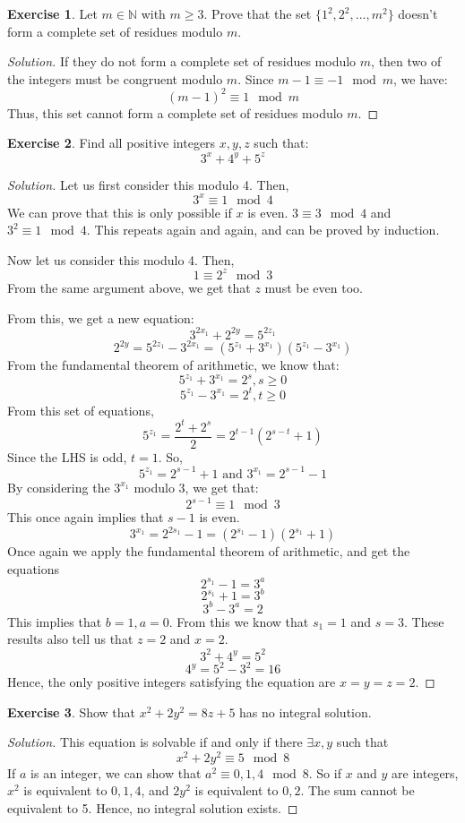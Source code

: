 \documentclass[12pt,letterpaper]{amsbook}
\theoremstyle{definition}
\newtheorem*{exercise}{Exercise}
\newenvironment{solution}
  {\renewcommand\qedsymbol{$\blacksquare$}\begin{proof}[Solution]}
  {\end{proof}}
\newcommand{\N}{\mathbb{N}}
\begin{document}
\begin{exercise}
  Let $m \in \N$ with $m \geq 3$. Prove that the set $\{1^2,2^2,...,m^2\}$ doesn't form a complete set of residues modulo $m$.
\end{exercise}
\begin{solution}
  If they do not form a complete set of residues modulo $m$, then two of the integers must be congruent modulo $m$. Since $m-1 \equiv -1 \mod m$, we have:
  \[(m-1)^2 \equiv 1 \mod m\]
  Thus, this set cannot form a complete set of residues modulo $m$.
\end{solution}

\begin{exercise}
  Find all positive integers $x,y,z$ such that:
  \[3^x + 4^y + 5^z\]
\end{exercise}
\begin{solution}
  Let us first consider this modulo 4. Then,
  \[3^x \equiv 1 \mod 4\]
  We can prove that this is only possible if $x$ is even. $3 \equiv 3 \mod 4$ and $3^2 \equiv 1 \mod 4$. This repeats again and again, and can be proved by induction.

  Now let us consider this modulo 4. Then,
  \[1 \equiv 2^z \mod 3\]
  From the same argument above, we get that $z$ must be even too.

  From this, we get a new equation:
  \[3^{2x_1} + 2^{2y} = 5^{2z_1}\]
  \[2^{2y} = 5^{2z_1} - 3^{2x_1} = (5^{z_1} + 3^{x_1})(5^{z_1} - 3^{x_1})\]
  From the fundamental theorem of arithmetic, we know that:
  \[5^{z_1} + 3^{x_1} = 2^s, s \geq 0\]
  \[5^{z_1} - 3^{x_1} = 2^t, t \geq 0\]
  From this set of equations,
  \[5^{z_1} = \frac{2^t+2^s}{2} = 2^{t-1}(2^{s-t}+1)\]
  Since the LHS is odd, $t = 1$. So,
  \[5^{z_1} = 2^{s-1}+1 \text{ and } 3^{x_1} = 2^{s-1}-1\]
  By considering the $3^{x_1}$ modulo 3, we get that:
  \[2^{s-1} \equiv 1 \mod 3\]
  This once again implies that $s-1$ is even.
  \[3^{x_1} = 2^{2s_1} - 1 = (2^{s_1} - 1)(2^{s_1} + 1)\]
  Once again we apply the fundamental theorem of arithmetic, and get the equations
  \[2^{s_1}-1 = 3^a\]
  \[2^{s_1}+1 = 3^b\]
  \[3^b-3^a = 2\]
  This implies that $b = 1, a = 0$. From this we know that $s_1 = 1$ and $s = 3$. These results also tell us that $z = 2$ and $x=2$.
  \[3^2+4^y = 5^2\]
  \[4^y = 5^2 - 3^2 = 16\]
  Hence, the only positive integers satisfying the equation are $x=y=z=2$.
\end{solution}

\begin{exercise}
  Show that $x^2 + 2y^2 = 8z + 5$ has no integral solution.
\end{exercise}
\begin{solution}
  This equation is solvable if and only if there $\exists x,y$ such that
  \[x^2 + 2y^2 \equiv 5 \mod 8\]
  If $a$ is an integer, we can show that $a^2 \equiv 0,1,4 \mod 8$. So if $x$ and $y$ are integers, $x^2$ is equivalent to $0,1,4$, and $2y^2$ is equivalent to $0,2$. The sum cannot be equivalent to 5. Hence, no integral solution exists.
\end{solution}
\end{document}
